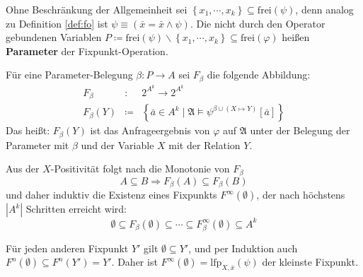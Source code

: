 Ohne Beschränkung der Allgemeinheit sei $\left\{ x_{1},\cdots,x_{k}\right\} \subseteq\mathrm{frei}\left(\psi\right)$,
denn analog zu Definition \ref{def:fo} ist $\psi\equiv\left(\bar{x}=\bar{x}\wedge\psi\right)$.
Die nicht durch den Operator gebundenen Variablen $P\coloneqq\mathrm{frei}\left(\psi\right)\backslash\left\{ x_{1},\cdots,x_{k}\right\} \subseteq\mathrm{frei}\left(\varphi\right)$
heißen \textbf{Parameter} der Fixpunkt-Operation.

Für eine Parameter-Belegung $\beta:P\rightarrow A$ sei $F_{\beta}$
die folgende Abbildung: 
\begin{eqnarray*}
F_{\beta} & : & 2^{A^{k}}\rightarrow2^{A^{k}}\\
F_{\beta}\left(Y\right) & \coloneqq & \left\{ \bar{a}\in A^{k}\mid\mathfrak{A}\models\psi^{\beta\cup\left(X\mapsto Y\right)}\left[\bar{a}\right]\right\} 
\end{eqnarray*}
Das heißt: $F_{\beta}\left(Y\right)$ ist das Anfrageergebnis von
$\varphi$ auf $\mathfrak{A}$ unter der Belegung der Parameter mit
$\beta$ und der Variable $X$ mit der Relation $Y$.

Aus der $X$-Positivität folgt nach \cite{Gurevich1986,Libkin2012}
die Monotonie von $F_{\beta}$
\[
A\subseteq B\Rightarrow F_{\beta}\left(A\right)\subseteq F_{\beta}\left(B\right)
\]
und daher induktiv die Existenz eines Fixpunkts $F^{\infty}\left(\emptyset\right)$,
der nach höchstens $\left|A^{k}\right|$ Schritten erreicht wird:
\[
\emptyset\subseteq F_{\beta}\left(\emptyset\right)\subseteq\cdots\subseteq F_{\beta}^{\infty}\left(\emptyset\right)\subseteq A^{k}
\]

Für jeden anderen Fixpunkt $Y'$ gilt $\emptyset\subseteq Y'$, und
per Induktion auch $F^{n}\left(\emptyset\right)\subseteq F^{n}\left(Y'\right)=Y'$.
Daher ist $F^{\infty}\left(\emptyset\right)=\mathrm{lfp}_{X,\bar{x}}\left(\psi\right)$
der kleinste Fixpunkt.

